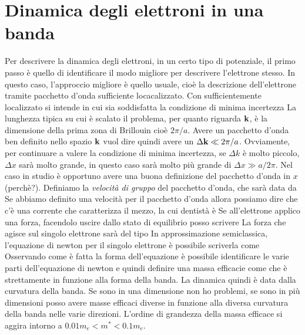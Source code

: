 \documentclass[a4paper,12pt]{article}
\begin{document}
\section{Dinamica degli elettroni in una banda}
Per descrivere la dinamica degli elettroni, in un certo tipo di potenziale, il primo passo è quello di identificare il modo migliore per descrivere l'elettrone stesso. In questo caso, l'approccio migliore è quello usuale, cioè la descrizione dell'elettrone tramite pacchetto d'onda sufficiente locacalizzato. Con sufficientemente localizzato si intende 
in cui sia soddisfatta la condizione di minima incertezza
La lunghezza tipica su cui è scalato il problema, per quanto riguarda ${\it\bf k}$, è la dimensione della prima zona di Brillouin cioè $2\pi/a$. Avere un pacchetto d'onda ben definito nello spazio ${\it\bf k}$ vuol dire quindi avere un $\Delta {\it\bf k} \ll 2\pi/a$. Ovviamente, per continuare a valere la condizione di minima incertezza, se $\Delta k$ è molto piccolo, $\Delta x$ sarà molto grande, in questo caso sarà molto più grande di $\Delta x \gg a/2\pi$. Nel caso in studio è opportuno avere una buona definizione del pacchetto d'onda in $x$ (perchè?). Definiamo la \textit{velocità di gruppo} del pacchetto d'onda, che sarà data da
Se abbiamo definito una velocità per il pacchetto d'onda allora possiamo dire che c'è una corrente che caratterizza il mezzo, la cui dentistà è
Se all'elettrone applico una forza, facendolo uscire dallo stato di equilibrio posso scrivere
La forza che agisce sul singolo elettrone sarà del tipo
In approssimazione semiclassica, l'equazione di newton per il singolo elettrone è possibile scriverla come
Osservando come è fatta la forma dell'equazione è possibile identificare le varie parti dell'equazione di newton e quindi definire una massa efficacie come 
che è strettamente in funzione alla forma della banda. La dinamica quindi è data dalla curvatura della banda. Se sono in una dimensione non ho problemi, se sono in più dimensioni posso avere masse efficaci diverse in funzione alla diversa curvatura della banda nelle varie direzioni. L'ordine di grandezza della massa efficace si aggira intorno a $0.01 m_e < m^* < 0.1 m_e$.
\end{document}
